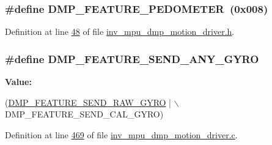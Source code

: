 \subsubsection[{\texorpdfstring{D\+M\+P\+\_\+\+F\+E\+A\+T\+U\+R\+E\+\_\+\+P\+E\+D\+O\+M\+E\+T\+ER}{DMP_FEATURE_PEDOMETER}}]{\setlength{\rightskip}{0pt plus 5cm}\#define D\+M\+P\+\_\+\+F\+E\+A\+T\+U\+R\+E\+\_\+\+P\+E\+D\+O\+M\+E\+T\+ER~(0x008)}\hypertarget{group___d_r_i_v_e_r_s_gabcf6a5bc9703782d711d0c6ba92ade85}{}\label{group___d_r_i_v_e_r_s_gabcf6a5bc9703782d711d0c6ba92ade85}


Definition at line \hyperlink{inv__mpu__dmp__motion__driver_8h_source_l00048}{48} of file \hyperlink{inv__mpu__dmp__motion__driver_8h_source}{inv\+\_\+mpu\+\_\+dmp\+\_\+motion\+\_\+driver.\+h}.

\subsubsection[{\texorpdfstring{D\+M\+P\+\_\+\+F\+E\+A\+T\+U\+R\+E\+\_\+\+S\+E\+N\+D\+\_\+\+A\+N\+Y\+\_\+\+G\+Y\+RO}{DMP_FEATURE_SEND_ANY_GYRO}}]{\setlength{\rightskip}{0pt plus 5cm}\#define D\+M\+P\+\_\+\+F\+E\+A\+T\+U\+R\+E\+\_\+\+S\+E\+N\+D\+\_\+\+A\+N\+Y\+\_\+\+G\+Y\+RO}\hypertarget{group___d_r_i_v_e_r_s_gadda8f4118bd084cfb4fcda3571585c56}{}\label{group___d_r_i_v_e_r_s_gadda8f4118bd084cfb4fcda3571585c56}
{\bfseries Value\+:}
\begin{DoxyCode}
(\hyperlink{group___d_r_i_v_e_r_s_gaa59d3ed6f0cbc66e99ce637546434b34}{DMP\_FEATURE\_SEND\_RAW\_GYRO} | \(\backslash\)
                                     DMP\_FEATURE\_SEND\_CAL\_GYRO)
\end{DoxyCode}


Definition at line \hyperlink{inv__mpu__dmp__motion__driver_8c_source_l00469}{469} of file \hyperlink{inv__mpu__dmp__motion__driver_8c_source}{inv\+\_\+mpu\+\_\+dmp\+\_\+motion\+\_\+driver.\+c}.

